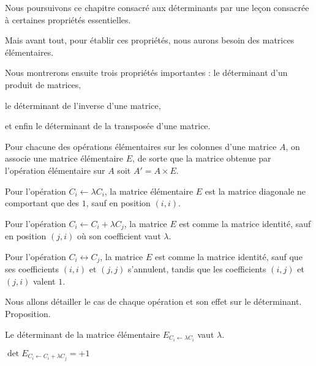 







\debuttexte


\diapo

\change
Nous poursuivons ce chapitre consacré aux déterminants par une leçon 
consacrée à certaines propriétés essentielles.

\change
Mais avant tout, pour établir ces propriétés, nous aurons besoin des matrices élémentaires.

\change
Nous montrerons ensuite trois propriétés importantes : le déterminant d'un produit de matrices,

\change
 le déterminant de l'inverse d'une matrice, 

\change
et enfin le déterminant de la transposée d'une matrice. 

\diapo
Pour chacune des opérations élémentaires sur les colonnes d'une matrice $A$, 
on associe une matrice élémentaire $E$, de sorte que la matrice obtenue par l'opération élémentaire sur $A$ soit $A'=A\times E$.

\change
Pour l'opération $C_i \leftarrow \lambda C_i$, la matrice élémentaire $E$ est la matrice diagonale ne comportant que des $1$, sauf en position $(i,i)$.

\change
Pour l'opération $C_i \leftarrow C_i+\lambda C_j$, la matrice $E$ est comme la matrice identité, sauf en position $(j,i)$ où son coefficient vaut $\lambda$.
 
\change
Pour l'opération $C_i \leftrightarrow C_j$, la matrice $E$ est comme la matrice identité, sauf que ses coefficients $(i,i)$ et $(j,j)$ s'annulent, tandis que les coefficients  $(i,j)$ et $(j,i)$ valent $1$.

\diapo
Nous allons détailler le cas de chaque opération et son effet sur le déterminant. 
\\

Proposition.

\change
Le déterminant de la matrice élémentaire $ E_{C_i \leftarrow \lambda C_i}$ vaut $ \lambda$.

\change
$\det E_{C_i \leftarrow C_i+\lambda C_j} = +1$

